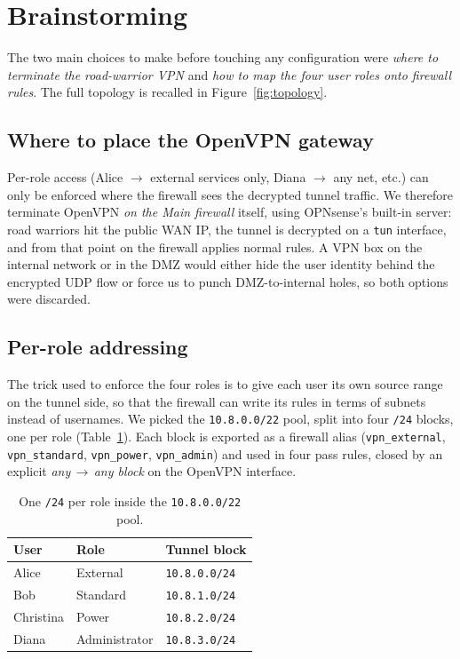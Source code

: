 \documentclass[twocolumn]{NobArticle}
\begin{document}
\section{Brainstorming}

The two main choices to make before touching any configuration were
\textit{where to terminate the road-warrior VPN} and \textit{how to map
the four user roles onto firewall rules}. The full topology is recalled
in Figure~\ref{fig:topology}.

\subsection{Where to place the OpenVPN gateway}

Per-role access (Alice $\to$ external services only, Diana $\to$ any net,
etc.) can only be enforced where the firewall sees the decrypted tunnel
traffic. We therefore terminate OpenVPN \textit{on the Main firewall}
itself, using OPNsense's built-in server: road warriors hit the public
WAN IP, the tunnel is decrypted on a \texttt{tun} interface, and from
that point on the firewall applies normal rules. A VPN box on the
internal network or in the DMZ would either hide the user identity behind
the encrypted UDP flow or force us to punch DMZ-to-internal holes, so
both options were discarded.

\subsection{Per-role addressing}

The trick used to enforce the four roles is to give each user its own
source range on the tunnel side, so that the firewall can write its
rules in terms of subnets instead of usernames. We picked the
\texttt{10.8.0.0/22} pool, split into four \texttt{/24} blocks, one per
role (Table~\ref{tab:vpnpools}). Each block is exported as a firewall
alias (\texttt{vpn\_external}, \texttt{vpn\_standard},
\texttt{vpn\_power}, \texttt{vpn\_admin}) and used in four pass rules,
closed by an explicit \textit{any\,$\to$\,any block} on the OpenVPN
interface.

\begin{table}[H]
\centering
\begin{tabular}{lll}
\toprule
\textbf{User} & \textbf{Role} & \textbf{Tunnel block} \\
\midrule
Alice     & External      & \texttt{10.8.0.0/24} \\
Bob       & Standard      & \texttt{10.8.1.0/24} \\
Christina & Power         & \texttt{10.8.2.0/24} \\
Diana     & Administrator & \texttt{10.8.3.0/24} \\
\bottomrule
\end{tabular}
\caption{One \texttt{/24} per role inside the \texttt{10.8.0.0/22} pool.}
\label{tab:vpnpools}
\end{table}
\end{document}
